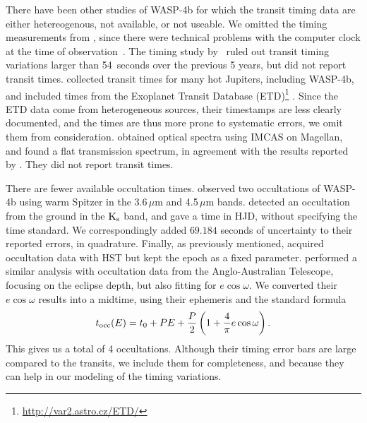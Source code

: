 \documentclass[12pt,twocolumn,tighten]{aastex62}
\begin{document}
There have been other studies of WASP-4b for which the transit timing
data are either hetereogenous, not available, or not useable.  We
omitted the timing measurements from
\citet{southworth_high-precision_2009}, since there were technical
problems with the computer clock at the time of
observation~\citep{nikolov_wasp-4b_2012}.  The timing study
by~\citet{petrucci_no_2013} ruled out transit timing variations larger
than 54~seconds over the previous 5 years, but did not report transit
times.  \citet{baluev_benchmarking_2015} collected transit times for
many hot Jupiters, including WASP-4b, and included times from the
Exoplanet Transit Database
(ETD)\footnote{\url{http://var2.astro.cz/ETD/}}
\citep{poddany_ETD_2010}.  Since the ETD data come from heterogeneous
sources, their timestamps are less clearly documented, and the times
are thus more prone to systematic errors, we omit them from
consideration.
\citet{may_mopss_2018} obtained optical spectra using IMCAS on
Magellan, and found a flat transmission spectrum, in agreement with
the results reported by \citet{huitson_gemini_2017}.  They did not
report transit times.

There are fewer available occultation times.
\citet{beerer_secondary_2011} observed two occultations of WASP-4b
using warm Spitzer in the 3.6\,$\mu$m and 4.5\,$\mu$m bands.
\citet{caceres_ground-based_2011} detected an occultation from the
ground in the ${\rm K}_{\rm s}$ band, and gave a time in HJD, without
specifying the time standard.  We correspondingly added $69.184$
seconds of uncertainty to their reported errors, in quadrature.
Finally, as previously mentioned, \citet{ranjan_atmospheric_2014}
acquired occultation data with HST but kept the epoch as a fixed
parameter.  \citet{zhou_secondary_2015} performed a similar analysis
with occultation data from the Anglo-Australian Telescope, focusing on
the eclipse depth, but also fitting for $e\cos\omega$.  We converted
their $e\cos\omega$ results into a midtime, using their ephemeris and
the standard formula \citep[{\it
e.g.},][]{charbonneau_detection_2005,winn_exoplanet_2010}
\begin{equation}
  t_{\rm occ}(E) =
  t_0 +  P E  +
  \frac{P}{2} \left( 1 + \frac{4}{\pi} e\cos\omega \right).
  \label{eq:occultation_time}
\end{equation}
This gives us a total of 4 occultations.  Although their timing error
bars are large compared to the transits, we include them for
completeness, and because they can help in our modeling of the timing
variations.
\end{document}
